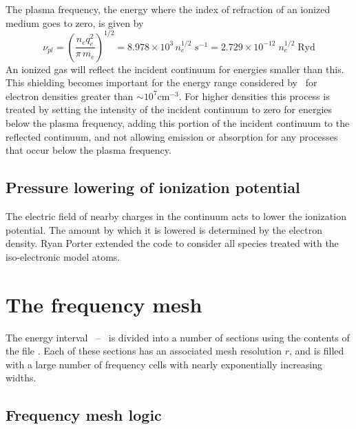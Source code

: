 The plasma frequency, the energy where the index of refraction of an
ionized medium goes to zero, is given by
\begin{equation}
{\nu _{pl}} = {\left( {\frac{{{n_e}q_e^2}}{{\pi \,{m_e}}}} \right)^{1/2}}
= 8.978 \times {10^3}\,n_e^{1/2}\;{s^{ - 1}} = 2.729 \times {10^{ -
12}}\;n_e^{1/2}\;{\mathrm{Ryd}}%
\end{equation}
An ionized gas will reflect the incident continuum for energies smaller
than this.  This shielding becomes important for the energy range considered
by \Cloudy\ for electron densities greater than $\sim 10^7 \mathrm{cm}^{-3}$.  For higher densities
this process is treated by setting the intensity of the incident continuum
to zero for energies below the plasma frequency, adding this portion of
the incident continuum to the reflected continuum, and not allowing emission
or absorption for any processes that occur below the plasma frequency.

\subsection{Pressure lowering of ionization potential}

The electric field of nearby charges in the continuum acts to lower the
ionization potential.  The amount by which it is lowered is determined by
the electron density.
Ryan Porter extended the code to consider all species
treated with the iso-electronic model atoms.

\section{The frequency mesh}

The energy interval \emm\ -- \egamry\ is divided into a number of sections
using the contents of the file . Each of these
sections has an associated mesh resolution $r$, and is filled with a large
number of frequency cells with nearly exponentially increasing widths.

\subsection{Frequency mesh logic}

